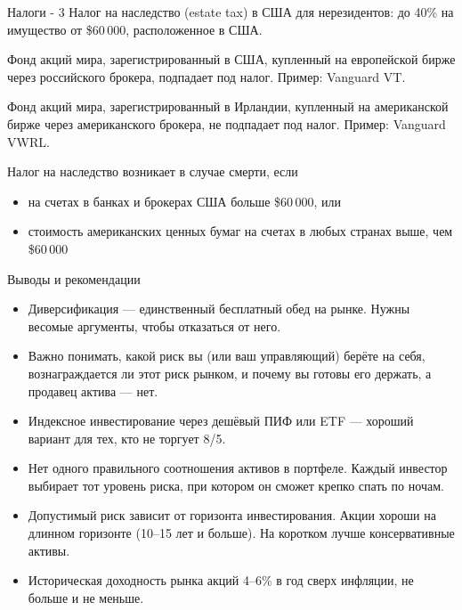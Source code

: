 \documentclass{beamer}
\begin{document}
\begin{frame}{Налоги - 3}
\justify
Налог на наследство (estate tax) в США для нерезидентов: до 40\% на имущество от \$60\,000, расположенное в США.

\justify
Фонд акций мира, зарегистрированный в США, купленный на европейской бирже через российского брокера, подпадает под налог. Пример: Vanguard VT.

\justify
Фонд акций мира, зарегистрированный в Ирландии, купленный на американской бирже через американского брокера, не подпадает под налог. Пример: Vanguard VWRL.

\justify
Налог на наследство возникает в случае смерти, если
\begin{itemize}
\justifying
\item на счетах в банках и брокерах США больше \$60\,000, или
\item стоимость американских ценных бумаг на счетах в любых странах выше, чем \$60\,000
\end{itemize}
\end{frame}



\begin{frame}{Выводы и рекомендации}
\begin{itemize}
\justifying
\item Диверсификация --- единственный бесплатный обед на рынке. Нужны весомые аргументы, чтобы
отказаться от него.
\item Важно понимать, какой риск вы (или ваш управляющий) берёте на себя, вознаграждается ли этот риск рынком, и почему вы готовы его держать, а продавец актива --- нет.
\item Индексное инвестирование через дешёвый ПИФ или ETF --- хороший вариант для тех, кто не торгует 8/5.
\item Нет одного правильного соотношения активов в портфеле. Каждый инвестор выбирает тот уровень риска, при котором он сможет крепко спать по ночам.
\item Допустимый риск зависит от горизонта инвестирования. Акции хороши на длинном горизонте (10--15 лет и больше). На коротком лучше консервативные активы.
\item Историческая доходность рынка акций 4--6\% в год сверх инфляции, не больше и не меньше.
\end{itemize}
\end{frame}
\end{document}
